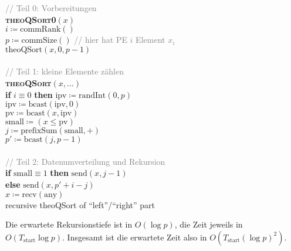 \begin{pseudocode}
  \textcolor{gray}{// Teil 0: Vorbereitungen} \\
  \textbf{\textsc{theoQSort0}}\( (x) \) \\
  \( i \coloneqq \text{commRank}() \) \\
  \( p \coloneqq \text{commSize}() \) \enskip \textcolor{gray}{// hier hat PE \( i \) Element \( x_i \)} \\
  \( \text{theoQSort}(x,0,p-1) \) \\
  \ \\
  \textcolor{gray}{// Teil 1: kleine Elemente zählen} \\
  \textbf{\textsc{theoQSort}}\( (x,\dots) \) \\
  \textbf{if} \( i \equiv 0 \) \textbf{then} \( \text{ipv} \coloneqq \text{randInt}(0,p) \) \\
  \( \text{ipv} \coloneqq \text{bcast}(\text{ipv}, 0) \) \\
  \( \text{pv} \coloneqq \text{bcast}(x, \text{ipv}) \) \\
  \( \text{small} \coloneqq (x \leq \text{pv}) \) \\
  \( j \coloneqq \text{prefixSum}(\text{small},+) \) \\
  \( p' \coloneqq \text{bcast}(j,p-1) \) \\
  \ \\
  \textcolor{gray}{// Teil 2: Datenumverteilung und Rekursion} \\
  \textbf{if} \( \text{small} \equiv 1 \) \textbf{then} \( \text{send}(x,j-1) \) \\
  \textbf{else} \( \text{send}(x,p'+i-j) \) \\
  \( x \coloneqq \text{recv}(\text{any}) \) \\
  recursive theoQSort of ``left''/``right'' part
\end{pseudocode}

Die erwartete Rekursionstiefe ist in \( O(\log p) \), die Zeit jeweils in \( O(T_\text{start}\log p) \). Insgesamt ist die erwartete Zeit also in \( O(T_\text{start}(\log p)^2) \).